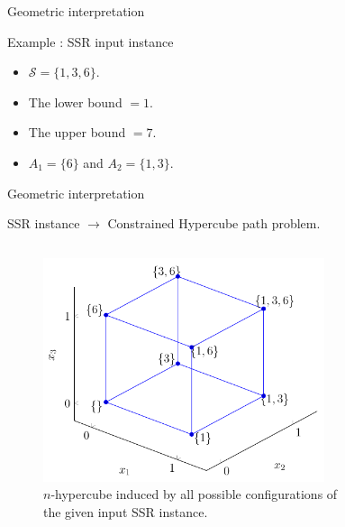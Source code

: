 \begin{frame}{Geometric interpretation}
  \begin{block}{Example : SSR input instance}
  \begin{itemize}
      \item $\mathcal{S} = \{1,3,6\}$.
      \item The lower bound $= 1$. 
      \item The upper bound $ = 7.$
      \item $A_1 = \{6\}$ and $A_2 = \{1,3\}.$
  \end{itemize}
  \end{block}
\end{frame}


\begin{frame}{Geometric interpretation}
  \begin{block}{SSR instance $\rightarrow$ Constrained Hypercube path problem.}
    \begin{columns}
        \begin{column}{0.5\textwidth}
            \begin{figure}
            \centering
            \includegraphics[width=0.9\textwidth]{img/subset_1.png}
            \caption{$n$-hypercube induced by all possible configurations of the given input SSR instance.}
            \label{fig:ps}
            \end{figure}
        \end{column}
        \pause
    \begin{column}{0.5\textwidth}
        \begin{figure}
        \centering

\end{figure}
\end{column}
\end{columns}
\end{block}
\end{frame}
